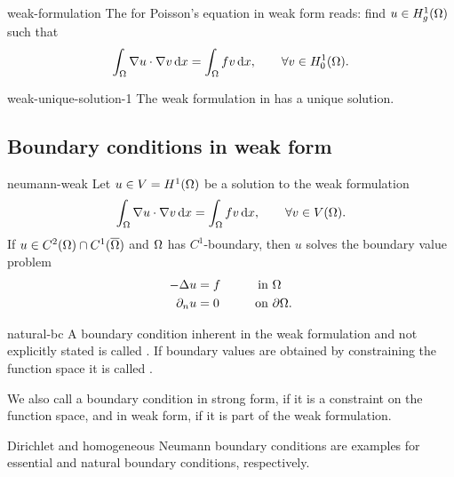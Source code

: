 \begin{Definition}{weak-formulation}
  The  for Poisson's equation in weak form
  reads: find $u\in H^1_g(\Omega)$ such that
  \begin{gather}
    \int_{\Omega} \nabla u\cdot\nabla v \,\mathrm{d} x
    = \int_{\Omega} fv\,\mathrm{d} x, \qquad\forall v\in H^1_0(\Omega).
  \end{gather}
\end{Definition}

\begin{Theorem}{weak-unique-solution-1}
  The weak formulation in  has
  a unique solution.
\end{Theorem}

\subsection{Boundary conditions in weak form}

\begin{Lemma}{neumann-weak}
  Let $u\in V=H^1(\Omega)$ be a solution to the weak formulation
  \begin{gather}
    \int_{\Omega} \nabla u\cdot\nabla v \,\mathrm{d} x
    = \int_{\Omega} fv\,\mathrm{d} x, \qquad\forall v\in V(\Omega).
  \end{gather}
  If $u\in C^2(\Omega) \cap C^1(\overline{\Omega})$ and $\Omega$
  has $C^1$-boundary, then $u$ solves the boundary value problem
  \begin{gather}
    \begin{aligned}
      -\Delta u &= f &\qquad \text{in } &\Omega\\
      \partial_n u &= 0 &\text{on } &\partial\Omega.
    \end{aligned}
  \end{gather}
\end{Lemma}

\begin{Definition}{natural-bc}
  A boundary condition inherent in the weak formulation and not
  explicitly stated is called . If
  boundary values are obtained by constraining the function space it
  is called .

  We also call a boundary condition in strong form, if it is a
  constraint on the function space, and in weak form, if it is part of
  the weak formulation.
\end{Definition}

\begin{remark}
  Dirichlet and homogeneous Neumann boundary conditions are examples
  for essential and natural boundary conditions, respectively.
\end{remark}

